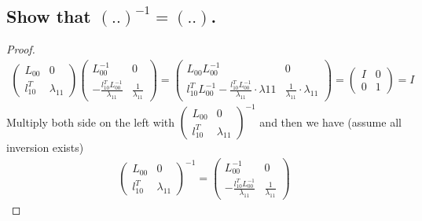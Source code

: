 \documentclass[11pt,a4paper]{article}
\begin{document}
\subsection{Show that $(..)^{-1} = (..)$.}
\begin{proof}
\begin{align}
    \left( \begin{array}{c|c} 
        L_{00} & 0 \\ \hline
        l_{10}^T & \lambda_{11}
    \end{array} \right)
    \left( \begin{array}{c|c} 
        L_{00}^{-1} & 0 \\ \hline
        -\frac{l_{10}^T L_{00}^{-1}}{\lambda_{11}} & \frac{1}{\lambda_{11}}
    \end{array} \right)
    = 
    \left( \begin{array}{c|c} 
        L_{00} L_{00}^{-1}  & 0 \\ \hline
        l_{10}^T L_{00}^{-1}-\frac{l_{10}^T L_{00}^{-1}}{\lambda_{11}}\cdot \lambda{11} 
        & \frac{1}{\lambda_{11}} \cdot \lambda_{11}
    \end{array} \right)
    =\left( \begin{array}{c|c} 
        I & 0 \\ \hline
        0 & 1
    \end{array} \right)
    = I
\end{align}
Multiply both side on the left with $\left( \begin{array}{c|c} 
        L_{00} & 0 \\ \hline
        l_{10}^T & \lambda_{11}
    \end{array} \right)^{-1}$ and then we have (assume all inversion exists)
\begin{align}
\left( \begin{array}{c|c} 
        L_{00} & 0 \\ \hline
        l_{10}^T & \lambda_{11}
    \end{array} \right)^{-1}
= \left( \begin{array}{c|c} 
        L_{00}^{-1} & 0 \\ \hline
        -\frac{l_{10}^T L_{00}^{-1}}{\lambda_{11}} & \frac{1}{\lambda_{11}}
    \end{array} \right)
\end{align}
\end{proof}
\end{document}
